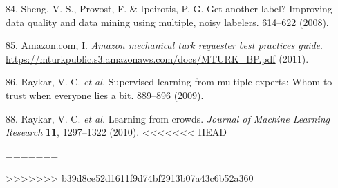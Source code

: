 \documentclass[]{article}
\begin{document}
\begin{cslreferences}
\leavevmode\hypertarget{ref-Sheng2008}{}%
84. Sheng, V. S., Provost, F. \& Ipeirotis, P. G. Get another label? Improving data quality and data mining using multiple, noisy labelers. 614--622 (2008).

\leavevmode\hypertarget{ref-MTurk2011}{}%
85. Amazon.com, I. \emph{Amazon mechanical turk requester best practices guide}. \url{https://mturkpublic.s3.amazonaws.com/docs/MTURK_BP.pdf} (2011).

\leavevmode\hypertarget{ref-Raykar2009}{}%
86. Raykar, V. C. \emph{et al.} Supervised learning from multiple experts: Whom to trust when everyone lies a bit. 889--896 (2009).

\leavevmode\hypertarget{ref-Raykar2010}{}%
88. Raykar, V. C. \emph{et al.} Learning from crowds. \emph{Journal of Machine Learning Research} \textbf{11}, 1297--1322 (2010).
<<<<<<< HEAD

=======
\end{cslreferences}
>>>>>>> b39d8ce52d1611f9d74bf2913b07a43c6b52a360
\end{document}
